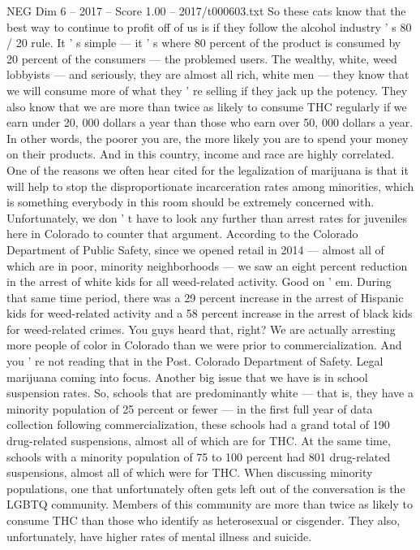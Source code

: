 \begin{textsample}{NEG Dim 6 – 2017 – Score 1.00 – 2017/t000603.txt}
So these cats know that the best way to continue to profit off of us is if they follow the alcohol industry ' s 80 / 20 rule.
It ' s simple — it ' s where 80 percent of the product is consumed by 20 percent of the consumers — the problemed users.
The wealthy, white, weed lobbyists — and seriously, they are almost all rich, white men — they know that we will consume more of what they ' re selling if they jack up the potency.
They also know that we are more than twice as likely to consume THC regularly if we earn under 20, 000 dollars a year than those who earn over 50, 000 dollars a year.
In other words, the poorer you are, the more likely you are to spend your money on their products.
And in this country, income and race are highly correlated.
One of the reasons we often hear cited for the legalization of marijuana is that it will help to stop the disproportionate incarceration rates among minorities, which is something everybody in this room should be extremely concerned with.
Unfortunately, we don ' t have to look any further than arrest rates for juveniles here in Colorado to counter that argument.
According to the Colorado Department of Public Safety, since we opened retail in 2014 — almost all of which are in poor, minority neighborhoods — we saw an eight percent reduction in the arrest of white kids for all weed-related activity.
Good on ' em.
During that same time period, there was a 29 percent increase in the arrest of Hispanic kids for weed-related activity and a 58 percent increase in the arrest of black kids for weed-related crimes.
You guys heard that, right?
We are actually arresting more people of color in Colorado than we were prior to commercialization.
And you ' re not reading that in the Post.
Colorado Department of Safety.
Legal marijuana coming into focus.
Another big issue that we have is in school suspension rates.
So, schools that are predominantly white — that is, they have a minority population of 25 percent or fewer — in the first full year of data collection following commercialization, these schools had a grand total of 190 drug-related suspensions, almost all of which are for THC.
At the same time, schools with a minority population of 75 to 100 percent had 801 drug-related suspensions, almost all of which were for THC.
When discussing minority populations, one that unfortunately often gets left out of the conversation is the LGBTQ community.
Members of this community are more than twice as likely to consume THC than those who identify as heterosexual or cisgender.
They also, unfortunately, have higher rates of mental illness and suicide.

\end{textsample}
